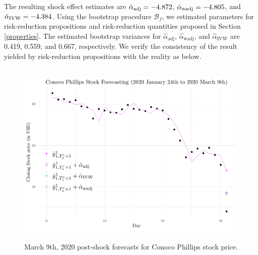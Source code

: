 \documentclass[11pt]{article}
\def\mc#1{\mathcal{#1}} %
\theoremstyle{definition}
\begin{document}

The resulting shock effect estimates are $\hat{\alpha}_{\rm adj}=-4.872$, $\hat{\alpha}_{\rm wadj}= -4.805$, and $\hat{\alpha}_{\rm IVW}=-4.384$. Using the bootstrap procedure $\mc{B}_f$, we estimated parameters for risk-reduction propositions and risk-reduction quantities proposed in  Section \ref{properties}. The estimated bootstrap variances for $\hat{\alpha}_{\text{adj}}$, $\hat{\alpha}_{\text{wadj}}$, and $\hat{\alpha}_{\text{IVW}}$  are 0.419, 0.559, and 0.667, respectively. %
We verify the consistency of the result yielded by risk-reduction propositions with the reality as below.

\begin{figure}
  \begin{center}
    \includegraphics[height = 9cm]{fig2.pdf}
    \caption{March 9th, 2020 post-shock forecasts for Conoco Phillips stock price.}
    \label{Fig:CP}
  \end{center}  
  \vspace{-.6cm}
\end{figure}
\end{document}
